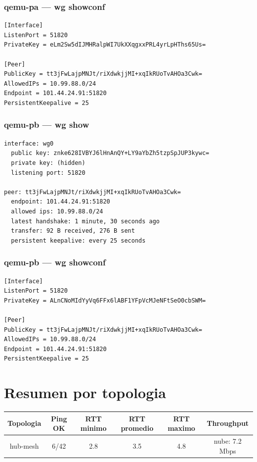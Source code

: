 \documentclass[11pt,a4paper]{article}
\begin{document}
\subsubsection*{qemu-pa — wg showconf}
\begin{lstlisting}
[Interface]
ListenPort = 51820
PrivateKey = eLm2Sw5dIJMHRalpWI7UkXXqgxxPRL4yrLpHThs65Us=

[Peer]
PublicKey = tt3jFwLajpMNJt/riXdwkjjMI+xqIkRUoTvAHOa3Cwk=
AllowedIPs = 10.99.88.0/24
Endpoint = 101.44.24.91:51820
PersistentKeepalive = 25

\end{lstlisting}

\subsubsection*{qemu-pb — wg show}
\begin{lstlisting}
interface: wg0
  public key: znke628IVBYJ6lHnAnQY+LY9aYbZh5tzpSpJUP3kywc=
  private key: (hidden)
  listening port: 51820

peer: tt3jFwLajpMNJt/riXdwkjjMI+xqIkRUoTvAHOa3Cwk=
  endpoint: 101.44.24.91:51820
  allowed ips: 10.99.88.0/24
  latest handshake: 1 minute, 30 seconds ago
  transfer: 92 B received, 276 B sent
  persistent keepalive: every 25 seconds

\end{lstlisting}

\subsubsection*{qemu-pb — wg showconf}
\begin{lstlisting}
[Interface]
ListenPort = 51820
PrivateKey = ALnCNoMIdYyVq6FFx6lABF1YFpVcMJeNFtSeO0cbSWM=

[Peer]
PublicKey = tt3jFwLajpMNJt/riXdwkjjMI+xqIkRUoTvAHOa3Cwk=
AllowedIPs = 10.99.88.0/24
Endpoint = 101.44.24.91:51820
PersistentKeepalive = 25

\end{lstlisting}

\section{Resumen por topologia}
\begin{longtable}{|c|c|c|c|c|c|}
\hline
Topologia & Ping OK & RTT minimo & RTT promedio & RTT maximo & Throughput \\ \hline
hub-mesh & 6/42 & 2.8 & 3.5 & 4.8 & nube: 7.2 Mbps \\ \hline
\end{longtable}
\end{document}
